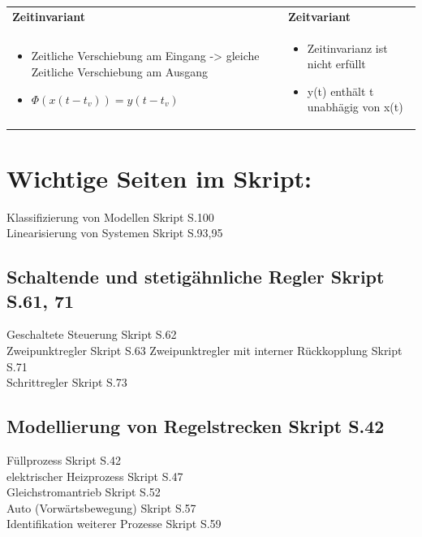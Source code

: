 \documentclass[margin=normal]{tex/hsrzf}
\newcommand{\titlewithref}[2]{\texorpdfstring{#1 {\scriptsize \color{RefColor}Skript S.#2}}{#1}}
\begin{document}
\begin{tabular}{|p{}|p{}|}
      \\
      \rowcolor{TabularTitleColor}
      \textbf{Zeitinvariant} & \textbf{Zeitvariant}  \\
      \begin{itemize}
            \item Zeitliche Verschiebung am Eingang -> gleiche Zeitliche Verschiebung am Ausgang
            \item $\Phi(x(t-t_v)) = y(t-t_v)$
      \end{itemize}
                             &
      \begin{itemize}
            \item Zeitinvarianz ist nicht erfüllt
            \item y(t) enthält t unabhägig von x(t)
      \end{itemize}
      \\
      \hline
\end{tabular}
\section{Wichtige Seiten im Skript:}
\titlewithref{Klassifizierung von Modellen}{100} \\
\titlewithref{Linearisierung von Systemen}{93,95}
\subsection{\titlewithref{Schaltende und stetigähnliche Regler}{61, 71}}
\titlewithref{Geschaltete Steuerung}{62} \\
\titlewithref{Zweipunktregler}{63}
\titlewithref{Zweipunktregler mit interner Rückkopplung}{71} \\
\titlewithref{Schrittregler}{73}
\subsection{\titlewithref{Modellierung von Regelstrecken}{42}}
\titlewithref{Füllprozess}{42} \\
\titlewithref{elektrischer Heizprozess}{47} \\
\titlewithref{Gleichstromantrieb}{52}\\
\titlewithref{Auto (Vorwärtsbewegung)}{57}\\
\titlewithref{Identifikation weiterer Prozesse}{59}

\newpage




\end{document}
